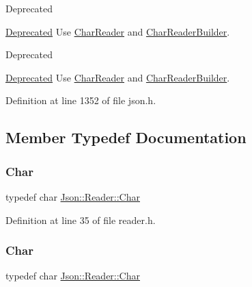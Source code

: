 \begin{DoxyRefDesc}{Deprecated}
\item[\hyperlink{deprecated__deprecated000005}{Deprecated}]Use \hyperlink{class_json_1_1_char_reader}{Char\+Reader} and \hyperlink{class_json_1_1_char_reader_builder}{Char\+Reader\+Builder}. \end{DoxyRefDesc}


\begin{DoxyRefDesc}{Deprecated}
\item[\hyperlink{deprecated__deprecated000011}{Deprecated}]Use \hyperlink{class_json_1_1_char_reader}{Char\+Reader} and \hyperlink{class_json_1_1_char_reader_builder}{Char\+Reader\+Builder}. \end{DoxyRefDesc}


Definition at line 1352 of file json.\+h.



\subsection{Member Typedef Documentation}
\hypertarget{class_json_1_1_reader_a3eec9118f3e9a672ba8348c3a79d0f45}{}\label{class_json_1_1_reader_a3eec9118f3e9a672ba8348c3a79d0f45} 
\subsubsection{\texorpdfstring{Char}{Char}\hspace{0.1cm}{\footnotesize\ttfamily [1/2]}}
{\footnotesize\ttfamily typedef char \hyperlink{class_json_1_1_reader_a3eec9118f3e9a672ba8348c3a79d0f45}{Json\+::\+Reader\+::\+Char}}



Definition at line 35 of file reader.\+h.

\hypertarget{class_json_1_1_reader_a3eec9118f3e9a672ba8348c3a79d0f45}{}\label{class_json_1_1_reader_a3eec9118f3e9a672ba8348c3a79d0f45} 
\subsubsection{\texorpdfstring{Char}{Char}\hspace{0.1cm}{\footnotesize\ttfamily [2/2]}}
{\footnotesize\ttfamily typedef char \hyperlink{class_json_1_1_reader_a3eec9118f3e9a672ba8348c3a79d0f45}{Json\+::\+Reader\+::\+Char}}



